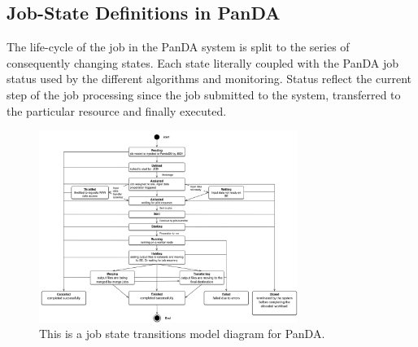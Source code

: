 
\subsection{Job-State Definitions in PanDA}
\label{subsec:jobstatedefs}

The life-cycle of the job in the PanDA system is split to the series of
consequently changing states. Each state literally coupled with the PanDA job
status used by the different algorithms and monitoring. Status reflect the
current step of the job processing since the job submitted to the system,
transferred to the particular resource and finally executed.

\begin{figure}
  \includegraphics[width=0.75\textwidth]{images/job-state-diagram.png}
\caption{This is a job state transitions model diagram for PanDA.}
\label{fig:jobstates}
\end{figure}

